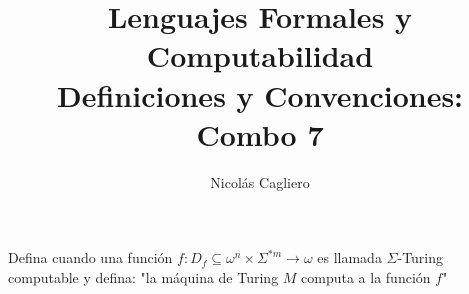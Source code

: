 \documentclass{article}
\title{Lenguajes Formales y Computabilidad \\
        \large Definiciones y Convenciones: Combo 7 }
\author{Nicolás Cagliero}
\begin{document}
\maketitle

Defina cuando una función $f : D_f \subseteq \omega^n \times \Sigma^{*m} 
\rightarrow \omega$
es llamada $\Sigma$-Turing computable y defina: "la máquina de Turing $M$
computa a la función $f$"
\end{document}

